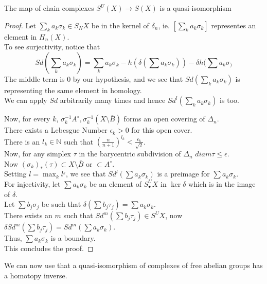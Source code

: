 \documentclass[../main.tex]{subfiles}
\begin{document}
\begin{lemma}
The map of chain complexes $S^{U}( X) \to S( X) $ is a quasi-isomorphism
\end{lemma}
\begin{proof}
Let $ \sum_{k}^{ } a_k \sigma_k\in S_N X $ be in the kernel of $\delta_n$, ie. $ [ \sum_k a_k \sigma_k] $ representes an element in $H_n( X) $.\\
To see surjectivity, notice that
\[ 
Sd( \sum_k a_k \sigma_k) = \sum_k a_k\sigma_k - h( \delta( \sum a_k \sigma_k) ) - \delta h( \sum a_k \sigma_) 
\]
The middle term is 0 by our hypothesis, and we see that $Sd( \sum_k a_k\sigma_k) $ is representing the same element in homology.\\
We can apply $Sd$ arbitrarily many times and hence $Sd^{l}( \sum_k a_k\sigma_k) $ is too.

Now, for every $k$, $\sigma_k^{-1}A^{\circ}, \sigma_k^{-1}( X\setminus \overline{B}) $ forms an open covering of $\Delta_n$.\\
There exists a Lebesgue Number $\epsilon_k>0$ for this open cover.\\
There is an $l_k \in \mathbb{N}$ such that $( \frac{n}{n+1})^{l_k}< \frac{\epsilon_k}{ \sqrt{2} }$.\\
Now, for any simplex $\tau$ in the barycentric subdivision of $\Delta_n$  $diam \tau \leq \epsilon$.\\
Now $( \sigma_k)_\ast ( \tau)  \subset X\setminus \overline{B}$ or $ \subset A^{\circ}$.\\
Setting $l= \max_k l^{_k}$, we see that $Sd^{l}( \sum a_k \sigma_k) $ is a preimage for $\sum a_k \sigma_k$.\\
For injectivity, let $\sum a_k \sigma_k$ be an element of $S^{U}_\bullet X$ in $\ker \delta$ which is in the image of $\delta$.\\
Let $\sum b_j \sigma_j $ be such that $\delta( \sum b_j \tau_j ) = \sum a_k \sigma_k $.\\
There exists an $m$ such that $Sd^{m}( \sum b_j \tau_j )\in S^{U}X $, now $\delta Sd^{m}( \sum b_j \tau_j ) = Sd^{m}( \sum a_k \sigma_k ) $.\\
Thus, $\sum a_k \sigma_k$ is a boundary.\\
This concludes the proof.
\end{proof}
We can now use that a quasi-isomorphism of complexes of free abelian groups has a homotopy inverse.
\end{document}
